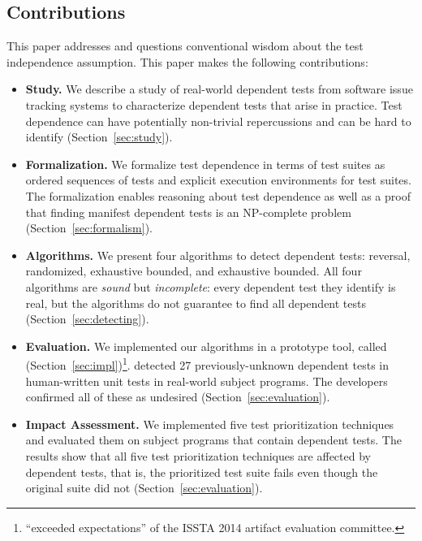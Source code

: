 \subsection{Contributions}
\label{sec:contributions}

This paper addresses and questions
conventional wisdom about the test independence assumption. 
This paper makes the following contributions:

\begin{itemize}

  \item \textbf{Study.} We describe a study of \dtnum real-world
  dependent tests from \repnum software issue tracking
  systems to characterize dependent tests that
  arise in practice.  Test dependence can have
  potentially non-trivial repercussions and can be hard to identify
  (Section~\ref{sec:study}).

\item \textbf{Formalization.} We formalize test dependence
  in terms of test suites as ordered sequences of tests and explicit execution
  environments for test suites.  The formalization enables reasoning about test dependence
  as well as a proof that finding manifest dependent tests is an NP-complete
  problem (Section~\ref{sec:formalism}).

  \item \textbf{Algorithms.} We present four algorithms
  to detect dependent tests: reversal,
  randomized, exhaustive bounded, and \dependenceaware{} exhaustive bounded.
  All four algorithms are \emph{sound} but \emph{incomplete}:
  every dependent test they identify is real, but the algorithms
  do not guarantee to find all dependent tests (Section~\ref{sec:detecting}). 

  \item \textbf{Evaluation.} We implemented our algorithms in a prototype
  tool, called \ourtool (Section~\ref{sec:impl})\footnote{\ourtool ``exceeded
  expectations'' of the ISSTA 2014 artifact evaluation committee.}.
  \ourtool detected 27 previously-unknown dependent tests in human-written
  unit tests in \subjnum real-world subject programs.
  The developers confirmed all of these as
  undesired (Section~\ref{sec:evaluation}).

  \item \textbf{Impact Assessment.} We implemented five test prioritization
  techniques and evaluated them on \subjnum subject programs
  that contain dependent tests. The results show that all
  five test prioritization techniques are affected by
  dependent tests, that is, the prioritized test suite fails even
  though the original suite did not (Section~\ref{sec:evaluation}).


\end{itemize}
